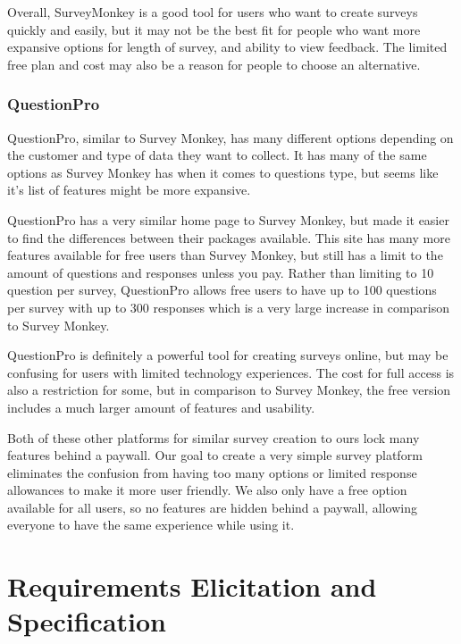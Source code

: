 \documentclass[letterpaper, 12 pt, conference]{ieeeconf}
\begin{document}
Overall, SurveyMonkey is a good tool for users who want to create surveys quickly and easily, but it may not be the best fit for people who want more expansive options for length of survey, and ability to view feedback. The limited free plan and cost may also be a reason for people to choose an alternative.

\break
\subsubsection*{QuestionPro}\hfill

QuestionPro, similar to Survey Monkey, has many different options depending on the customer and type of data they want to collect. It has many of the same options as Survey Monkey has when it comes to questions type, but seems like it's list of features might be more expansive.
\newline

QuestionPro has a very similar home page to Survey Monkey, but made it easier to find the differences between their packages available. This site has many more features available for free users than Survey Monkey, but still has a limit to the amount of questions and responses unless you pay. Rather than limiting to 10 question per survey, QuestionPro allows free users to have up to 100 questions per survey with up to 300 responses which is a very large increase in comparison to Survey Monkey.
\newline

QuestionPro is definitely a powerful tool for creating surveys online, but may be confusing for users with limited technology experiences. The cost for full access is also a restriction for some, but in comparison to Survey Monkey, the free version includes a much larger amount of features and usability.
\newline

Both of these other platforms for similar survey creation to ours lock many features behind a paywall. Our goal to create a very simple survey platform eliminates the confusion from having too many options or limited response allowances to make it more user friendly. We also only have a free option available for all users, so no features are hidden behind a paywall, allowing everyone to have the same experience while using it.


\newpage
\section{Requirements Elicitation and Specification}
\end{document}
